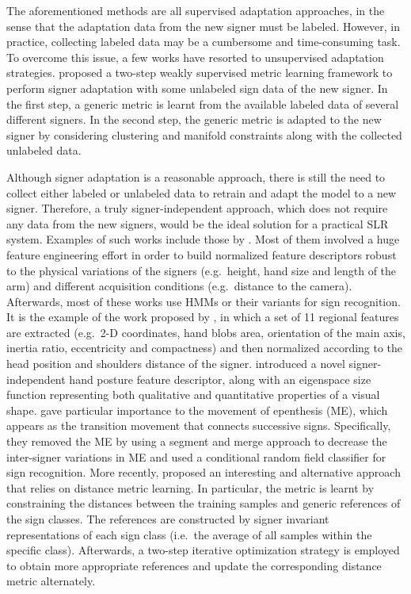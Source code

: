 The aforementioned methods are all supervised adaptation approaches, in the sense that the adaptation data from the new signer must be labeled. However, in practice, collecting labeled data may be a cumbersome and time-consuming task. To overcome this issue, a few works have resorted to unsupervised adaptation strategies. \citet{Yin2015} proposed a two-step weakly supervised metric learning framework to perform signer adaptation with some unlabeled sign data of the new signer. In the first step, a generic metric is learnt from the available labeled data of several different signers. In the second step, the generic metric is adapted to the new signer by considering clustering and manifold constraints along with the collected unlabeled data.

Although signer adaptation is a reasonable approach, there is still the need to collect either labeled or unlabeled data to retrain and adapt the model to a new signer. Therefore, a truly signer-independent approach, which does not require any data from the new signers, would be the ideal solution for a practical SLR system. Examples of such works include those by \citet{Zieren2005, Shanableh2011, Agris2008b, Kong2014, Kelly2010, Dahmani2014, Yin2016}. Most of them involved a huge feature engineering effort in order to build normalized feature descriptors robust to the physical variations of the signers (e.g.\ height, hand size and length of the arm) and different acquisition conditions (e.g.\ distance to the camera). Afterwards, most of these works use HMMs or their variants for sign recognition. It is the example of the work proposed by \citet{Agris2008b}, in which a set of 11 regional features are extracted (e.g.\ 2-D coordinates, hand blobs area, orientation of the main axis, inertia ratio, eccentricity and compactness) and then normalized according to the head position and shoulders distance of the signer. \citet{Kelly2010} introduced a novel signer-independent hand posture feature descriptor, along with an eigenspace size function representing both qualitative and quantitative properties of a visual shape. \citet{Kong2014} gave particular importance to the movement of epenthesis (ME), which appears as the transition movement that connects successive signs. Specifically, they removed the ME by using a segment and merge approach to decrease the inter-signer variations in ME and used a conditional random field classifier for sign recognition. More recently, \citet{Yin2016} proposed an interesting and alternative approach that relies on distance metric learning. In particular, the metric is learnt by constraining the distances between the training samples and generic references of the sign classes. The references are constructed by signer invariant representations of each sign class (i.e.\ the average of all samples within the specific class). Afterwards, a two-step iterative optimization strategy is employed to obtain more appropriate references and update the corresponding distance metric alternately.

